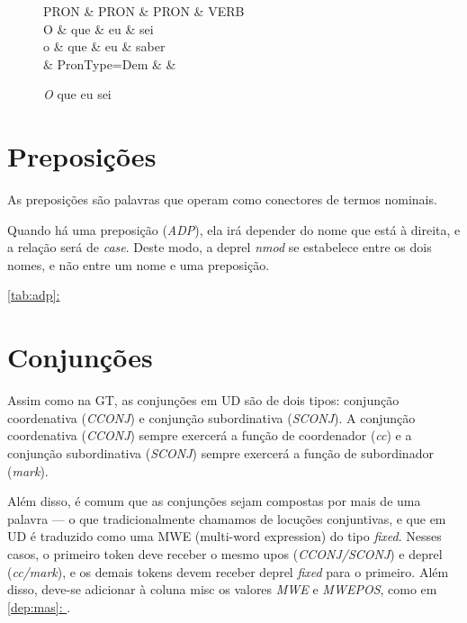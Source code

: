 \documentclass[output=paper,colorlinks,citecolor=brown]{langscibook}
\newcommand*{\fullref}[1]{\hyperref[{#1}]{\autoref*{#1}: \nameref*{#1}}} %
\begin{document}
		\begin{figure}[htbp]
			\centering
			\vspace{.8cm}
			\begin{dependency}
				\begin{deptext}
					PRON \& PRON \& PRON \& VERB \\
					O \& que \& eu \& sei \\
					o \& que \& eu \& saber \\
					\& PronType=Dem \& \& \\
				\end{deptext}
			\end{dependency}
			\caption{\emph{O} que eu sei}\label{dep:oqueeusei}
		\end{figure}


\section{Preposições}

As preposições são palavras que operam como conectores de termos nominais.

	Quando há uma preposição (\emph{ADP}), ela irá depender do nome que está à direita, e a relação será de \emph{case}. Deste modo, a deprel \emph{nmod} se estabelece entre os dois nomes, e não entre um nome e uma preposição.
	
	\fullref{tab:adp}


\section{Conjunções}\label{sec:conjuncoes}

	Assim como na GT, as conjunções em UD são de dois tipos: conjunção coordenativa (\emph{CCONJ}) e conjunção subordinativa (\emph{SCONJ}). A conjunção coordenativa (\emph{CCONJ}) sempre exercerá a função de coordenador (\emph{cc}) e a conjunção subordinativa (\emph{SCONJ}) sempre exercerá a função de subordinador (\emph{mark}).

	Além disso, é comum que as conjunções sejam compostas por mais de uma palavra — o que tradicionalmente chamamos de locuções conjuntivas, e que em UD é traduzido como uma MWE (multi-word expression) do tipo \emph{fixed}. Nesses casos, o primeiro token deve receber o mesmo upos (\emph{CCONJ/SCONJ}) e deprel (\emph{cc/mark}), e os demais tokens devem receber deprel \emph{fixed} para o primeiro. Além disso, deve-se adicionar à coluna misc os valores \emph{MWE} e \emph{MWEPOS}, como em \fullref{dep:mas}.
	
\end{document}
